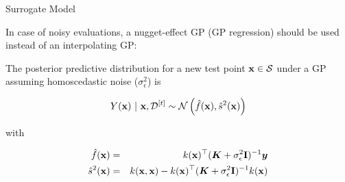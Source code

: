 \documentclass[11pt,compress,t,notes=noshow, xcolor=table]{beamer}
\begin{document}
\begin{vbframe}{Surrogate Model}

In case of noisy evaluations, a nugget-effect GP (GP regression) should be used instead of an interpolating GP:

\vspace{1em}

The posterior predictive distribution for a new test point $\mathbf{x} \in \mathcal{S}$ under a GP assuming homoscedastic noise ($\sigma_{\epsilon}^{2}$) is

\begin{eqnarray*}
  Y(\mathbf{x}) ~|~ \mathbf{x}, \mathcal{D}^{[t]} \sim \mathcal{N}\left(\hat{f}(\mathbf{x}), \hat{s}^2(\mathbf{x})\right)
\end{eqnarray*}

with 

\begin{eqnarray*}
  \hat{f}(\mathbf{x}) &=& k(\mathbf{x})^\top (\bm{K} + \sigma_{\epsilon}^{2}\mathbf{I})^{-1} \bm{y} \\
  \hat{s}^2(\mathbf{x}) &=& k(\mathbf{x}, \mathbf{x}) - k(\mathbf{x})^\top (\bm{K} + \sigma_{\epsilon}^{2}\mathbf{I})^{-1} k(\mathbf{x})
\end{eqnarray*}

\vspace{+0.45cm}


\end{vbframe}
\end{document}
